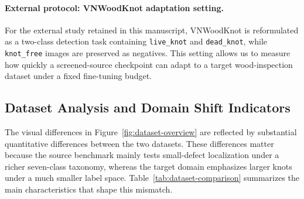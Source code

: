 \paragraph{External protocol: VNWoodKnot adaptation setting.}
For the external study retained in this manuscript, VNWoodKnot is reformulated as a two-class detection task containing \texttt{live\_knot} and \texttt{dead\_knot}, while \texttt{knot\_free} images are preserved as negatives. This setting allows us to measure how quickly a screened-source checkpoint can adapt to a target wood-inspection dataset under a fixed fine-tuning budget.

\subsection{Dataset Analysis and Domain Shift Indicators}
\label{sec:data-analysis}

The visual differences in Figure~\ref{fig:dataset-overview} are reflected by substantial quantitative differences between the two datasets. These differences matter because the source benchmark mainly tests small-defect localization under a richer seven-class taxonomy, whereas the target domain emphasizes larger knots under a much smaller label space. Table~\ref{tab:dataset-comparison} summarizes the main characteristics that shape this mismatch.

